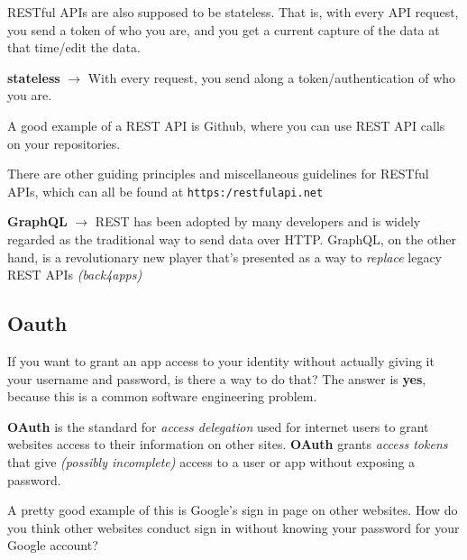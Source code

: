 \documentclass[english, 10pt]{article}
\begin{document}
RESTful APIs are also supposed to be stateless. That is, with every API request, you send a token of who you are, and you get a current capture of the data at that time/edit the data.\newline

\begin{tcolorbox}[title=Definition:,colframe=red!75!black,colback=red!5!white,arc=0pt,fonttitle=\bfseries]
	\textbf{stateless} $\rightarrow$ With every request, you send along a token/authentication of who you are.
	\end{tcolorbox}

A good example of a REST API is Github, where you can use REST API calls on your repositories.\newline

There are other guiding principles and miscellaneous guidelines for RESTful APIs, which can all be found at \texttt{https:/restfulapi.net}\newline

\begin{tcolorbox}[title=Aside: GRAPHQL,colframe=black,colback=white,arc=0pt,fonttitle=\bfseries]
\textbf{GraphQL} $\rightarrow$ REST has been adopted by many developers and is widely regarded as the traditional way to send data over HTTP. GraphQL, on the other hand, is a revolutionary new player that's presented as a way to \textit{replace} legacy REST APIs \textit{(back4apps)}
\end{tcolorbox}

\subsection{Oauth}

If you want to grant an app access to your identity without actually giving it your username and password, is there a way to do that? The answer is \textbf{yes}, because this is a common software engineering problem.\newline

\textbf{OAuth} is the standard for \textit{access delegation} used for internet users to grant websites access to their information on other sites. \textbf{OAuth}  grants \textit{access tokens} that give  \textit{(possibly incomplete)} access to a user or app without exposing a password.\newline

A pretty good example of this is Google's sign in page on other websites. How do you think other websites conduct sign in without knowing your password for your Google account?
\end{document}

